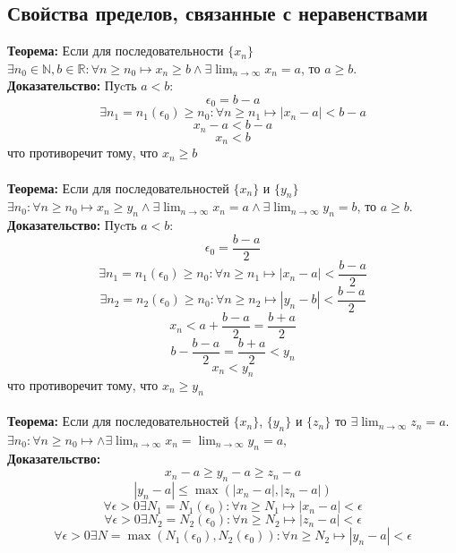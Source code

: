 \documentclass{article}
\begin{document}
    \subsection*{Свойства  пределов,  связанные  с неравенствами}
        \textbf{Теорема:} Если для последовательности $\{x_n\}$
        $\exists n_0 \in \mathbb{N}, b \in \mathbb{R}: \forall n \ge n_0 \longmapsto x_n \ge b \wedge \exists \lim_{n\to\infty} x_n = a$, то $a \ge b$.
        \\
        \textbf{Доказательство:}
        Пуcть $a < b$:
        \[ \epsilon_0 = b - a \]
        \[ \exists n_1 = n_1(\epsilon_0) \ge n_0: \forall n \ge n_1 \longmapsto |x_n - a| < b - a \]
        \[ x_n - a < b - a \]
        \[ x_n < b \]
        что противоречит тому, что $x_n \ge b $
        \\
        \\
        \textbf{Теорема:} Если для последовательностей $\{x_n\}$ и $\{y_n\}$
        $\exists n_0: \forall n \ge n_0 \longmapsto x_n \ge y_n \wedge \exists \lim_{n\to\infty} x_n = a \wedge \exists \lim_{n\to\infty} y_n = b$, то $a \ge b$.
        \\
        \textbf{Доказательство:}
        Пуcть $a < b$:
        \[ \epsilon_0 = \frac{b - a}{2} \]
        \[ \exists n_1 = n_1(\epsilon_0) \ge n_0: \forall n \ge n_1 \longmapsto |x_n - a| < \frac{b - a}{2} \]
        \[ \exists n_2 = n_2(\epsilon_0) \ge n_0: \forall n \ge n_2 \longmapsto |y_n - b| < \frac{b - a}{2} \]
        \[ x_n < a + \frac{b - a}{2} = \frac{b + a}{2} \]
        \[ b - \frac{b - a}{2} = \frac{b + a}{2} < y_n \]
        \[ x_n < y_n \]
        что противоречит тому, что $x_n \ge y_n $
        \\
        \\
        \textbf{Теорема:} Если для последовательностей $\{x_n\}$, $\{y_n\}$ и $\{z_n\}$
        то $\exists \lim_{n\to\infty} z_n = a$.
        $\exists n_0: \forall n \ge n_0 \longmapsto  \wedge \exists \lim_{n\to\infty} x_n = \lim_{n\to\infty} y_n = a$,
        \\
        \textbf{Доказательство:}
        \[ x_n - a \ge y_n - a \ge z_n - a \]
        \[ |y_n - a| \le \max(|x_n - a|, |z_n - a|) \]
        \[ \forall \epsilon > 0 \exists N_1 = N_1(\epsilon_0): \forall n \ge N_1 \longmapsto |x_n - a| < \epsilon \]
        \[ \forall \epsilon > 0 \exists N_2 = N_2(\epsilon_0): \forall n \ge N_2 \longmapsto |z_n - a| < \epsilon \]
        \[ \forall \epsilon > 0 \exists N = \max(N_1(\epsilon_0), N_2(\epsilon_0)): \forall n \ge N_2 \longmapsto |y_n - a| < \epsilon \]
    
\end{document}

